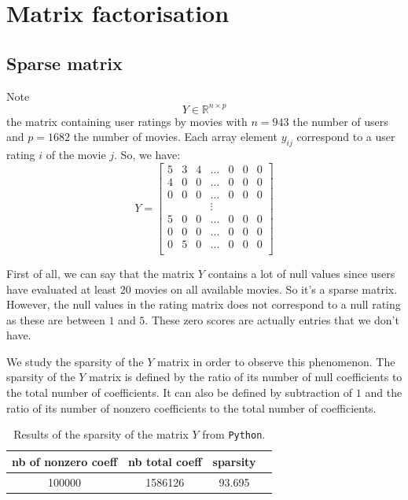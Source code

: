\documentclass{article}
\begin{document}
\section{Matrix factorisation}
\subsection{Sparse matrix}
Note
$$Y \in \mathbb{R}^{n \times p}$$ the matrix containing user ratings by movies with $n=943$ the number of users and $p=1682$ the number of movies. Each array element $y_{ij}$ correspond to a user rating $i$ of the movie $j$. So, we have:
$$Y=\begin{bmatrix}
5 & 3 & 4 & \dots & 0 & 0 & 0\\
4 & 0 & 0 & \dots & 0 & 0 & 0\\
0 & 0 & 0 & \dots & 0 & 0 & 0\\
  &   &   & \vdots\\
5 & 0 & 0 & \dots & 0 & 0 & 0\\
0 & 0 & 0 & \dots & 0 & 0 & 0\\
0 & 5 & 0 & \dots & 0 & 0 & 0\\
\end{bmatrix}$$

First of all, we can say that the matrix $Y$ contains a lot of null values since users have evaluated at least $20$ movies on all available movies. So it’s a sparse matrix.
However, the null values in the rating matrix does not correspond to a null rating as these are between $1$ and $5$. These zero scores are actually entries that we don’t have.

We study the sparsity of the $Y$ matrix in order to observe this phenomenon. The sparsity of the $Y$ matrix is defined by the ratio of its number of null coefficients to the total number of coefficients. It can also be defined by subtraction of $1$ and the ratio of its number of nonzero coefficients to the total number of coefficients.

\begin{table}[H]
    \centering
    \begin{tabular}{|c|c|c|c|}
    \hline
      nb of nonzero coeff &  nb total coeff & sparsity \\\hline
        100000 & 1586126 & 93.695 \\\hline
    \end{tabular}
    \caption{Results of the sparsity of the matrix $Y$ from \texttt{Python}.}
    \label{tab:sparsity}
\end{table}
\end{document}
